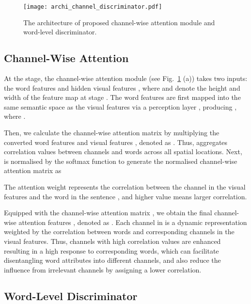 \documentclass{article}
\begin{document}
\begin{figure}[t]
\centering
\begin{minipage}{1\textwidth}
\texttt{[image: archi\_channel\_discriminator.pdf]}
\end{minipage}
\caption{The architecture of proposed channel-wise attention module and word-level discriminator.}
\label{fig:archi_channel_dis}
\end{figure}

\subsection{Channel-Wise Attention}
\label{sec:channel-attention}
At the  stage, the channel-wise attention module (see Fig.~\ref{fig:archi_channel_dis} (a)) takes two inputs: the word features  and hidden visual features , where  and  denote the height and width of the feature map at stage . The word features  are first mapped into the same semantic space as the visual features  via a perception layer , producing , where .

Then, we calculate the channel-wise attention matrix  by multiplying the converted word features  and visual features , denoted as . Thus,  aggregates correlation values between channels and words across all spatial locations. Next,  is normalised by the softmax function to generate the normalised channel-wise attention matrix  as

The attention weight  represents the correlation between the  channel in the visual features  and the  word in the sentence , and higher value means larger correlation.

Equipped with the channel-wise attention matrix , we obtain the final channel-wise attention features , denoted as . 
Each channel in  is a dynamic representation weighted by the correlation between words and corresponding channels in the visual features.
Thus, channels with high correlation values are enhanced resulting in a high response to corresponding words, which can facilitate disentangling word attributes into different channels, and also reduce the influence from irrelevant channels by assigning a lower correlation.

\subsection{Word-Level Discriminator}
\label{sec:word}
 
\end{document}
